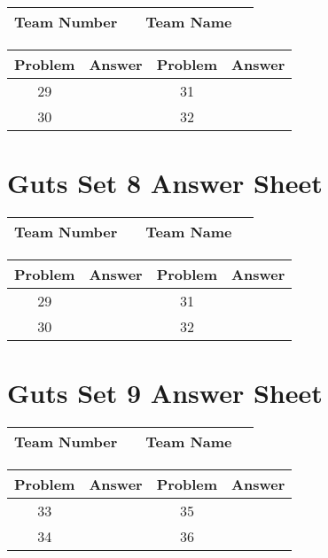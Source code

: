 \documentclass[14pt]{article}
\begin{document}
\begin{center}
\begin{tabular}{|r|r|r|r|}
\hline
	Team Number & \hspace{10em} &
	Team Name & \hspace{15em} \\ \hline
\end{tabular}
\end{center}
\begin{tabularx}{\textwidth}{|c|l|c|X|}\hline
	Problem & Answer & Problem & Answer \\\hline
	29 & \hspace{15em} & 31 & \\\hline
	30 & & 32 & \\\hline
\end{tabularx}

\vspace{30px}

\section*{Guts Set 8 Answer Sheet}

\begin{center}
\begin{tabular}{|r|r|r|r|}
\hline
	Team Number & \hspace{10em} &
	Team Name & \hspace{15em} \\ \hline
\end{tabular}
\end{center}
\begin{tabularx}{\textwidth}{|c|l|c|X|}\hline
	Problem & Answer & Problem & Answer \\\hline
	29 & \hspace{15em} & 31 & \\\hline
	30 & & 32 & \\\hline
\end{tabularx}

\section*{Guts Set 9 Answer Sheet}

\begin{center}
\begin{tabular}{|r|r|r|r|}
\hline
	Team Number & \hspace{10em} &
	Team Name & \hspace{15em} \\ \hline
\end{tabular}
\end{center}
\begin{tabularx}{\textwidth}{|c|l|c|X|}\hline
	Problem & Answer & Problem & Answer \\\hline
	33 & \hspace{15em} & 35 & \\\hline
	34 & & 36 & \\\hline
\end{tabularx}
\end{document}
